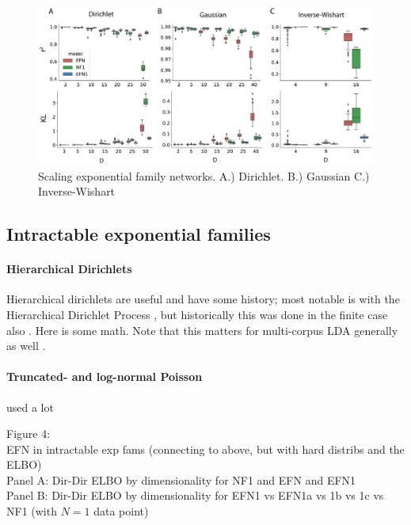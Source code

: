 \documentclass{article}
\begin{document}
 \begin{figure}
  \centering
\includegraphics[scale=0.46]{figs/fig3/fig3.pdf}
  \caption{Scaling exponential family networks.  A.) Dirichlet.  B.) Gaussian  C.) Inverse-Wishart}
\end{figure}

\subsection{Intractable exponential families}


\paragraph{Hierarchical Dirichlets}

Hierarchical dirichlets are useful and have some history; most notable is with the  Hierarchical Dirichlet Process \cite{teh2006hdp}, but historically this was done in the finite case also \cite{mackay1995hierarchical}.  Here is some math.    Note that this matters for multi-corpus LDA generally as well \cite{blei2003latent, pritchard2000inference}.


\paragraph{Truncated- and log-normal Poisson}

used a lot \cite{gao2016linear}\cite{adams2009tractable}\cite{cunningham2008fast,cunningham2008inferring}

Figure 4: \\
EFN in intractable exp fams (connecting to above, but with hard distribs and the ELBO) \\
Panel A: Dir-Dir ELBO by dimensionality for NF1 and EFN and EFN1\\
Panel B: Dir-Dir ELBO by dimensionality for EFN1 vs EFN1a vs 1b vs 1c vs NF1 (with $N=1$ data point)\\
\end{document}
